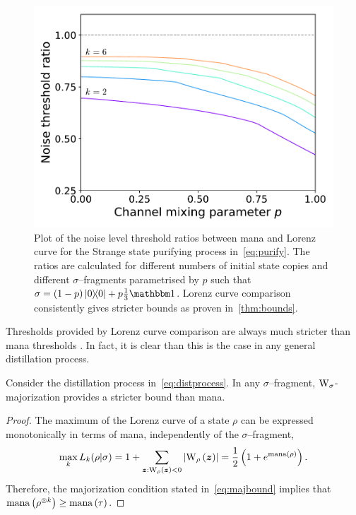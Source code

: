 \documentclass[pra,
aps,
twocolumn,
superscriptaddress,
groupedaddress,
nofootinbib,
reprint
]{revtex4-1}
\begin{document}
\begin{figure}
    \centering
    \includegraphics[scale=0.5]{figs/ratios.pdf}
    \caption{Plot of the noise level threshold ratios between mana and Lorenz curve for the Strange state purifying process in~\cref{eq:purify}.
    The ratios are calculated for different numbers of initial state copies and different $\sigma$--fragments parametrised by $p$ such that $\sigma = (1-p)\ketbra{0} + p \frac{1}{3}\id$.
    Lorenz curve comparison consistently gives stricter bounds as proven in~\cref{thm:bounds}.
    }
    \label{fig:distill}
\end{figure}

Thresholds provided by Lorenz curve comparison are always much stricter than mana thresholds .
In fact, it is clear than this is the case in any general distillation process.
\begin{theorem}\label{thm:bounds}
    Consider the distillation process in~\cref{eq:distprocess}.
    In any $\sigma$--fragment, $\W{\sigma}$-majorization provides a stricter bound than mana.
\end{theorem}
\begin{proof}
    The maximum of the Lorenz curve of a state $\rho$ can be expressed monotonically in terms of mana, independently of the $\sigma$--fragment,
    \begin{equation}
        \max_k{L_k(\rho | \sigma)} = 1 + \sum_{\bmz: \W[\bmz]{\rho}<0} \abs{\W[\bmz]{\rho}} = \frac{1}{2} \left( 1 + e^\mana{\rho} \right).
    \end{equation}
    Therefore, the majorization condition stated in~\cref{eq:majbound} implies that ${{\rm{mana}}\left(\rho^{\otimes k}\right)} \geq {{\rm{mana}}\left(\tau\right)}$. 
\end{proof}
\end{document}
